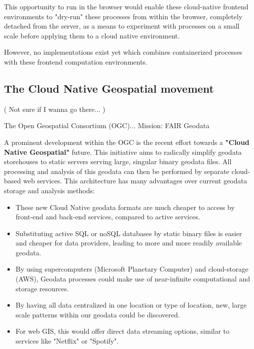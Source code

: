 \m{->} This opportunity to run in the browser would enable these cloud-native frontend environments to "dry-run" these processes from within the browser, completely detached from the server, as a means to experiment with processes on a small scale before applying them to a cloud native environment. 

\m{->} However, no implementations exist yet which combines containerized processes with these frontend computation environments. 









\subsection*{The Cloud Native Geospatial movement}

( Not sure if I wanna go there... )

The Open Geospatial Consortium (OGC)...
Mission: FAIR Geodata 

A prominent development within the OGC is the recent effort towards a \textbf{"Cloud Native Geospatial"} future. 
This initiative aims to radically simplify geodata storehouses to static servers serving large, singular binary geodata files. All processing and analysis of this geodata can then be performed by separate cloud-based web services. 
This architecture has many advantages over current geodata storage and analysis methods:
\begin{itemize}
  \item These new Cloud Native geodata formats are much cheaper to access by front-end and back-end services, compared to active services.
  \item Substituting active SQL or noSQL databases by static binary files is easier and cheaper for data providers, leading to more and more readily available geodata.
  \item By using supercomputers (Microsoft Planetary Computer) and cloud-storage (AWS), Geodata processes could make use of near-infinite computational and storage resources. 
  \item By having all data centralized in one location or type of location, new, large scale patterns within our geodata could be discovered.  
  \item For web GIS, this would offer direct data streaming options, similar to services like "Netflix" or "Spotify".  
\end{itemize}

